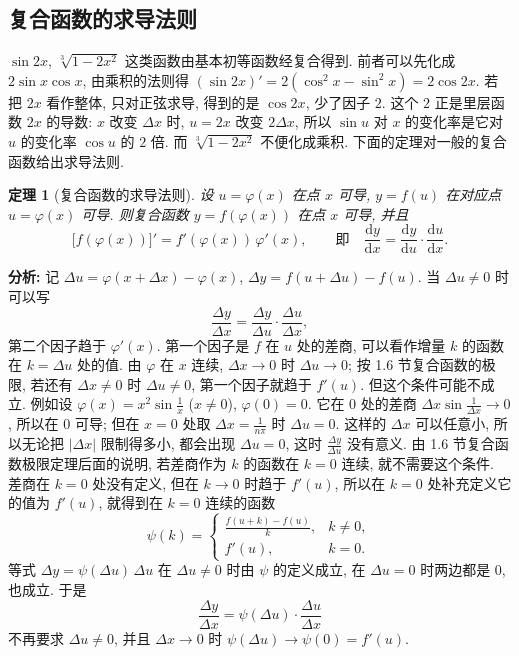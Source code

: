 \documentclass[UTF8,openany]{ctexbook}
\theoremstyle{chinesetextbook}
\newtheorem{theorem}{定理}[section]
\newcommand{\dd}{\mathrm d}
\begin{document}
\subsection{复合函数的求导法则}
$\sin2x$, $\sqrt[3]{1-2x^2}$ 这类函数由基本初等函数经复合得到. 前者可以先化成 $2\sin x\cos x$, 由乘积的法则得 $(\sin2x)'=2(\cos^2x-\sin^2x)=2\cos2x$. 若把 $2x$ 看作整体, 只对正弦求导, 得到的是 $\cos2x$, 少了因子 $2$. 这个 $2$ 正是里层函数 $2x$ 的导数: $x$ 改变 $\Delta x$ 时, $u=2x$ 改变 $2\Delta x$, 所以 $\sin u$ 对 $x$ 的变化率是它对 $u$ 的变化率 $\cos u$ 的 $2$ 倍. 而 $\sqrt[3]{1-2x^2}$ 不便化成乘积. 下面的定理对一般的复合函数给出求导法则.
\begin{theorem}[复合函数的求导法则]\label{thm:c2-2-chain}
设 $u=\varphi(x)$ 在点 $x$ 可导, $y=f(u)$ 在对应点 $u=\varphi(x)$ 可导. 则复合函数 $y=f(\varphi(x))$ 在点 $x$ 可导, 并且
\[
\bigl[f(\varphi(x))\bigr]'=f'(\varphi(x))\,\varphi'(x),\qquad\text{即}\quad\frac{\dd y}{\dd x}=\frac{\dd y}{\dd u}\cdot\frac{\dd u}{\dd x}.
\]
\end{theorem}
\par\indent\textbf{分析:} 记 $\Delta u=\varphi(x+\Delta x)-\varphi(x)$, $\Delta y=f(u+\Delta u)-f(u)$. 当 $\Delta u\ne0$ 时可以写
\[
\frac{\Delta y}{\Delta x}=\frac{\Delta y}{\Delta u}\cdot\frac{\Delta u}{\Delta x},
\]
第二个因子趋于 $\varphi'(x)$. 第一个因子是 $f$ 在 $u$ 处的差商, 可以看作增量 $k$ 的函数在 $k=\Delta u$ 处的值. 由 $\varphi$ 在 $x$ 连续, $\Delta x\to0$ 时 $\Delta u\to0$; 按 1.6 节复合函数的极限, 若还有 $\Delta x\ne0$ 时 $\Delta u\ne0$, 第一个因子就趋于 $f'(u)$. 但这个条件可能不成立. 例如设 $\displaystyle\varphi(x)=x^2\sin\frac1x$ ($x\ne0$), $\varphi(0)=0$. 它在 $0$ 处的差商 $\displaystyle\Delta x\sin\frac1{\Delta x}\to0$, 所以在 $0$ 可导; 但在 $x=0$ 处取 $\displaystyle\Delta x=\frac1{n\pi}$ 时 $\Delta u=0$. 这样的 $\Delta x$ 可以任意小, 所以无论把 $|\Delta x|$ 限制得多小, 都会出现 $\Delta u=0$, 这时 $\displaystyle\frac{\Delta y}{\Delta u}$ 没有意义. 由 1.6 节复合函数极限定理后面的说明, 若差商作为 $k$ 的函数在 $k=0$ 连续, 就不需要这个条件. 差商在 $k=0$ 处没有定义, 但在 $k\to0$ 时趋于 $f'(u)$, 所以在 $k=0$ 处补充定义它的值为 $f'(u)$, 就得到在 $k=0$ 连续的函数
\[
\psi(k)=\begin{cases}\frac{f(u+k)-f(u)}k,&k\ne0,\\f'(u),&k=0.\end{cases}
\]
等式 $\Delta y=\psi(\Delta u)\,\Delta u$ 在 $\Delta u\ne0$ 时由 $\psi$ 的定义成立, 在 $\Delta u=0$ 时两边都是 $0$, 也成立. 于是
\[
\frac{\Delta y}{\Delta x}=\psi(\Delta u)\cdot\frac{\Delta u}{\Delta x}
\]
不再要求 $\Delta u\ne0$, 并且 $\Delta x\to0$ 时 $\psi(\Delta u)\to\psi(0)=f'(u)$.
\end{document}
